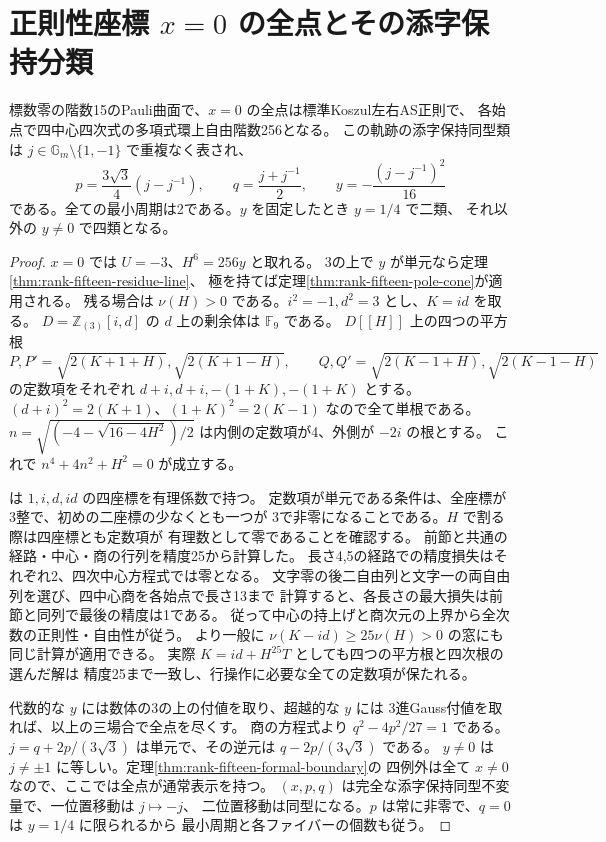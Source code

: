 \section{正則性座標 $x=0$ の全点とその添字保持分類}
\label{sec:rank-fifteen-x-zero}
\begin{theorem}\label{thm:rank-fifteen-x-zero}
標数零の階数15のPauli曲面で、$x=0$ の全点は標準Koszul左右AS正則で、
各始点で四中心四次式の多項式環上自由階数256となる。
この軌跡の添字保持同型類は $j\in\mathbb G_m\setminus\{1,-1\}$ で重複なく表され、
\[
 p=\frac{3\sqrt3}{4}(j-j^{-1}),\qquad
 q=\frac{j+j^{-1}}2,\qquad
 y=-\frac{(j-j^{-1})^2}{16}
\]
である。全ての最小周期は2である。$y$ を固定したとき $y=1/4$ で二類、
それ以外の $y\ne0$ で四類となる。
\end{theorem}
\begin{proof}
$x=0$ では $U=-3$、$H^6=256y$ と取れる。
3の上で $y$ が単元なら定理\ref{thm:rank-fifteen-residue-line}、
極を持てば定理\ref{thm:rank-fifteen-pole-cone}が適用される。
残る場合は $\nu(H)>0$ である。$i^2=-1,d^2=3$ とし、$K=id$ を取る。
$D=\mathbb Z_{(3)}[i,d]$ の $d$ 上の剰余体は $\mathbb F_9$ である。
$D[[H]]$ 上の四つの平方根
\[
 P,P'=\sqrt{2(K+1+H)},\sqrt{2(K+1-H)},\qquad
 Q,Q'=\sqrt{2(K-1+H)},\sqrt{2(K-1-H)}
\]
の定数項をそれぞれ $d+i,d+i,-(1+K),-(1+K)$ とする。
$(d+i)^2=2(K+1)$、$(1+K)^2=2(K-1)$ なので全て単根である。
$n=\sqrt{(-4-\sqrt{16-4H^2})/2}$ は内側の定数項が4、外側が $-2i$ の根とする。
これで $n^4+4n^2+H^2=0$ が成立する。

 は $1,i,d,id$ の四座標を有理係数で持つ。
定数項が単元である条件は、全座標が3整で、初めの二座標の少なくとも一つが
3で非零になることである。$H$ で割る際は四座標とも定数項が
有理数として零であることを確認する。
前節と共通の経路・中心・商の行列を精度25から計算した。
長さ4,5の経路での精度損失はそれぞれ2、四次中心方程式では零となる。
文字零の後二自由列と文字一の両自由列を選び、四中心商を各始点で長さ13まで
計算すると、各長さの最大損失は前節と同列で最後の精度は1である。
従って中心の持上げと商次元の上界から全次数の正則性・自由性が従う。
より一般に $\nu(K-id)\ge25\nu(H)>0$ の窓にも同じ計算が適用できる。
実際 $K=id+H^{25}T$ としても四つの平方根と四次根の選んだ解は
精度25まで一致し、行操作に必要な全ての定数項が保たれる。

代数的な $y$ には数体の3の上の付値を取り、超越的な $y$ には
3進Gauss付値を取れば、以上の三場合で全点を尽くす。
商の方程式より $q^2-4p^2/27=1$ である。
$j=q+2p/(3\sqrt3)$ は単元で、その逆元は $q-2p/(3\sqrt3)$ である。
$y\ne0$ は $j\ne\pm1$ に等しい。定理\ref{thm:rank-fifteen-formal-boundary}の
四例外は全て $x\ne0$ なので、ここでは全点が通常表示を持つ。
$(x,p,q)$ は完全な添字保持同型不変量で、一位置移動は $j\mapsto-j$、
二位置移動は同型になる。$p$ は常に非零で、$q=0$ は $y=1/4$ に限られるから
最小周期と各ファイバーの個数も従う。
\end{proof}

